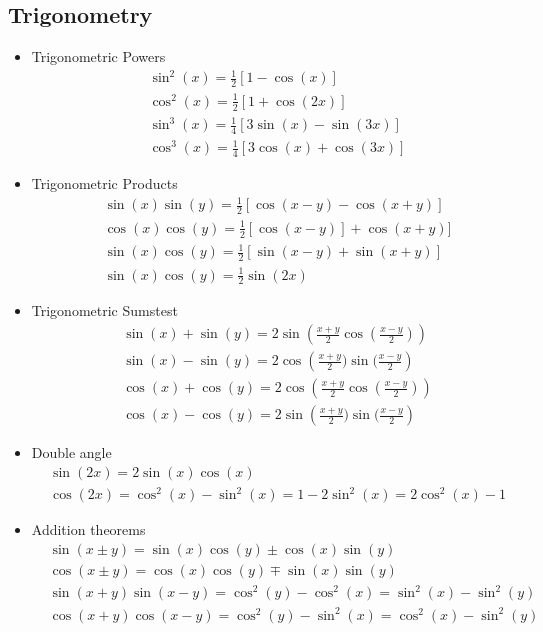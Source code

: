 \documentclass[a4paper, fontsize=8pt, landscape, DIV=1]{scrartcl}
\begin{document}
\begin{multicols*}{4}
  \subsection{Trigonometry}
  \begin{itemize}
    \item Trigonometric Powers
    {\small\begin{align*}
      & \sin^2(x) = \frac{1}{2}[1-\cos(x)] \\
      & \cos^2(x) = \frac{1}{2}[1+\cos(2x)] \\
      & \sin^3(x) = \frac{1}{4}[3\sin(x)-\sin(3x)] \\
      & \cos^3(x) = \frac{1}{4}[3\cos(x) + \cos(3x)]
    \end{align*}}%

    \item Trigonometric Products
    {\small\begin{align*}
      & \sin(x)\sin(y) = \frac{1}{2}[\cos(x-y) - \cos(x+y)] \\
      &\cos(x)\cos(y) = \frac{1}{2}[\cos(x-y)] + \cos(x+y)] \\
      & \sin(x)\cos(y) = \frac{1}{2}[\sin(x-y) + \sin(x+y)] \\
      &\sin(x)\cos(y) = \frac{1}{2}\sin(2x)
    \end{align*}}%

    \item Trigonometric Sumstest
    {\small\begin{align*}
      & \sin(x) + \sin(y) = 2\sin\left(\frac{x+y}{2}\cos(\frac{x-y}{2})\right)\\
      & \sin(x)-\sin(y) = 2\cos\left(\frac{x+y}{2})\sin(\frac{x-y}{2}\right) \\
      & \cos(x) + \cos(y) = 2\cos\left(\frac{x+y}{2}\cos(\frac{x-y}{2})\right)\\
      & \cos(x)-\cos(y) = 2\sin\left(\frac{x+y}{2})\sin(\frac{x-y}{2}\right)
    \end{align*}}%

    \item Double angle
    {\small\begin{align*}
      & \sin(2x) = 2\sin(x)\cos(x) \\
      & \cos(2x) = \cos^2(x)-\sin^2(x) = 1-2\sin^2(x) = 2\cos^2(x) - 1
    \end{align*}}%

    \item Addition theorems
    {\small\begin{align*}
      & \sin(x\pm y) = \sin(x)\cos(y) \pm \cos(x)\sin(y) \\
      & \cos(x\pm y) = \cos(x)\cos(y) \mp \sin(x)\sin(y) \\
      & \sin(x+y)\sin(x-y) = \cos^2(y)-\cos^2(x) = \sin^2(x) - \sin^2(y)\\
      & \cos(x+y)\cos(x-y) = \cos^2(y)-\sin^2(x) = \cos^2(x) - \sin^2(y)
    \end{align*}}%
  \end{itemize}


\end{multicols*}
\end{document}
